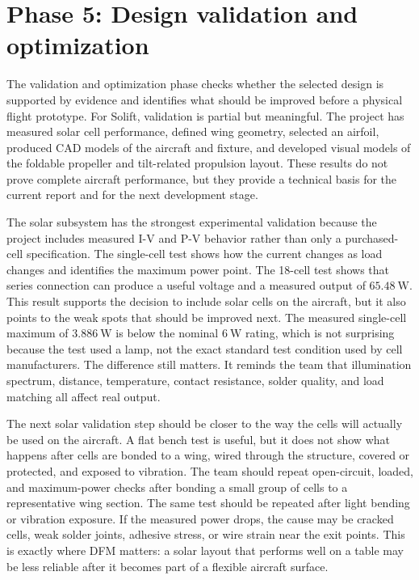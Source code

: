 \section{Phase 5: Design validation and optimization}
\label{subsec:phase5-validation}

The validation and optimization phase checks whether the selected design is supported by evidence and identifies what should be improved before a physical flight prototype. For Solift, validation is partial but meaningful. The project has measured solar cell performance, defined wing geometry, selected an airfoil, produced CAD models of the aircraft and fixture, and developed visual models of the foldable propeller and tilt-related propulsion layout. These results do not prove complete aircraft performance, but they provide a technical basis for the current report and for the next development stage.

The solar subsystem has the strongest experimental validation because the project includes measured I-V and P-V behavior rather than only a purchased-cell specification. The single-cell test shows how the current changes as load changes and identifies the maximum power point. The 18-cell test shows that series connection can produce a useful voltage and a measured output of \(65.48~\mathrm{W}\). This result supports the decision to include solar cells on the aircraft, but it also points to the weak spots that should be improved next. The measured single-cell maximum of \(3.886~\mathrm{W}\) is below the nominal \(6~\mathrm{W}\) rating, which is not surprising because the test used a lamp, not the exact standard test condition used by cell manufacturers. The difference still matters. It reminds the team that illumination spectrum, distance, temperature, contact resistance, solder quality, and load matching all affect real output.

The next solar validation step should be closer to the way the cells will actually be used on the aircraft. A flat bench test is useful, but it does not show what happens after cells are bonded to a wing, wired through the structure, covered or protected, and exposed to vibration. The team should repeat open-circuit, loaded, and maximum-power checks after bonding a small group of cells to a representative wing section. The same test should be repeated after light bending or vibration exposure. If the measured power drops, the cause may be cracked cells, weak solder joints, adhesive stress, or wire strain near the exit points. This is exactly where DFM matters: a solar layout that performs well on a table may be less reliable after it becomes part of a flexible aircraft surface.

